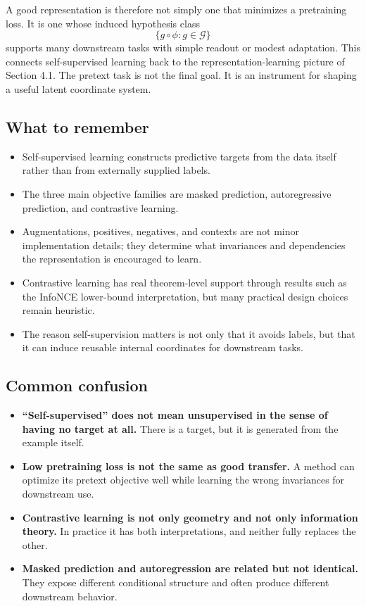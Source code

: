 A good representation is therefore not simply one that minimizes a pretraining loss.
It is one whose induced hypothesis class
\[
\{g \circ \phi : g \in \mathcal{G}\}
\]
supports many downstream tasks with simple readout or modest adaptation.
This connects self-supervised learning back to the representation-learning picture of Section 4.1.
The pretext task is not the final goal.
It is an instrument for shaping a useful latent coordinate system.

\subsection*{What to remember}

\begin{itemize}
    \item Self-supervised learning constructs predictive targets from the data itself rather than from externally supplied labels.
    \item The three main objective families are masked prediction, autoregressive prediction, and contrastive learning.
    \item Augmentations, positives, negatives, and contexts are not minor implementation details; they determine what invariances and dependencies the representation is encouraged to learn.
    \item Contrastive learning has real theorem-level support through results such as the InfoNCE lower-bound interpretation, but many practical design choices remain heuristic.
    \item The reason self-supervision matters is not only that it avoids labels, but that it can induce reusable internal coordinates for downstream tasks.
\end{itemize}

\subsection*{Common confusion}

\begin{itemize}
    \item \textbf{``Self-supervised'' does not mean unsupervised in the sense of having no target at all.} There is a target, but it is generated from the example itself.
    \item \textbf{Low pretraining loss is not the same as good transfer.} A method can optimize its pretext objective well while learning the wrong invariances for downstream use.
    \item \textbf{Contrastive learning is not only geometry and not only information theory.} In practice it has both interpretations, and neither fully replaces the other.
    \item \textbf{Masked prediction and autoregression are related but not identical.} They expose different conditional structure and often produce different downstream behavior.
\end{itemize}


